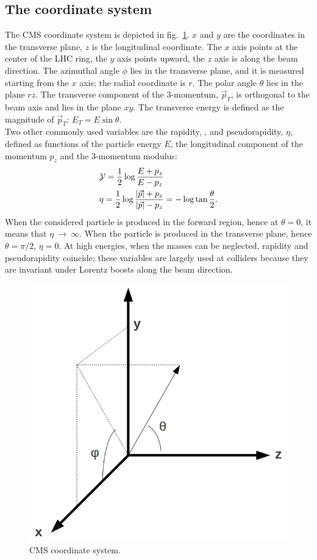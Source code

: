 \subsection{The coordinate system}
The CMS coordinate system is depicted in fig.~\ref{fig:CMS_CoordSys}. $x$ and $y$ are the coordinates in the transverse plane, $z$ is the longitudinal coordinate. The $x$ axis points at the center of the LHC ring, the $y$ axis points upward, the $z$ axis is along the beam direction. The azimuthal angle $\phi$ lies in the transverse plane, and it is measured starting from the $x$ axis; the radial coordinate is $r$. The polar angle $\theta$ lies in the plane $rz$. The transverse component of the 3-momentum, $\vec{p}_T$, is orthogonal to the beam axis and lies in the plane $xy$. The transverse energy is defined as the magnitude of $\vec{p}_T$: $E_T = E \sin{\theta}$.\\
Two other commonly used variables are the rapidity, \rap, and pseudorapidity, $\eta$, defined as functions of the particle energy $E$, the longitudinal component of the momentum $p_z$ and the 3-momentum modulus:
\begin{equation}
\begin{split}
 & \mathcal{Y} = \frac{1}{2} \log{\frac{E + p_z}{E - p_z}}\\
 & \eta = \frac{1}{2} \log{\frac{|\vec{p}| + p_z}{|\vec{p}| - p_z}} = -\log{\tan{\frac{\theta}{2}}}.
\end{split}
\end{equation}
When the considered particle is produced in the forward region, hence at $\theta = 0$, it means that $\eta~\rightarrow~\infty$. When the particle is produced in the transverse plane, hence $\theta = \pi /2$, $\eta = 0$. At high energies, when the masses can be neglected, rapidity and pseudorapidity coincide; these variables are largely used at colliders because they are invariant under Lorentz boosts along the beam direction.

\begin{figure}[!htb]
  \centering
    \includegraphics[width=.25\textwidth]{figures/CMS_CoordSys.jpg}
  \caption{CMS coordinate system.}
  \label{fig:CMS_CoordSys}
\end{figure}

